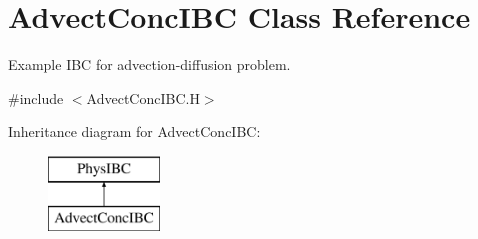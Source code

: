 \hypertarget{class_advect_conc_i_b_c}{\section{Advect\-Conc\-I\-B\-C Class Reference}
\label{class_advect_conc_i_b_c}
}


Example I\-B\-C for advection-\/diffusion problem.  




{\ttfamily \#include $<$Advect\-Conc\-I\-B\-C.\-H$>$}

Inheritance diagram for Advect\-Conc\-I\-B\-C\-:\begin{figure}[H]
\begin{center}
\leavevmode
\includegraphics[height=2.000000cm]{class_advect_conc_i_b_c}
\end{center}
\end{figure}
